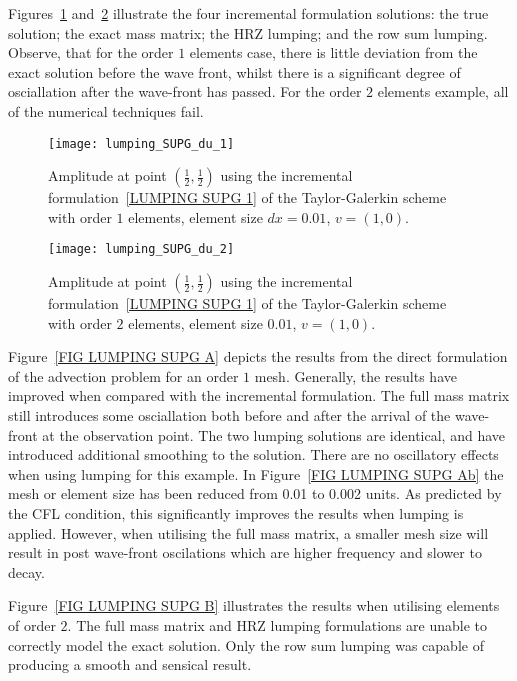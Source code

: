 Figures~\ref{FIG LUMPING SUPG INC A} and~\ref{FIG LUMPING SUPG INC B} illustrate
the four incremental formulation solutions: the true solution; the exact mass matrix;
the HRZ lumping; and the row sum lumping. Observe, that for the order $1$ elements
case, there is little deviation from the exact solution before the wave front,
whilst there is a significant degree of osciallation after the wave-front has 
passed. For the order $2$ elements example, all of the numerical techniques fail. 

\begin{figure}[ht]
\centerline{\texttt{[image: lumping\_SUPG\_du\_1]}}
\caption{Amplitude at point $(\frac{1}{2},\frac{1}{2})$ using the incremental formulation~\ref{LUMPING SUPG 1} of the 
Taylor-Galerkin scheme with order $1$ elements, element size $dx=0.01$, $v=(1,0)$.}
\label{FIG LUMPING SUPG INC A}
\end{figure}

\begin{figure}[ht]
\centerline{\texttt{[image: lumping\_SUPG\_du\_2]}}
\caption{Amplitude at point $(\frac{1}{2},\frac{1}{2})$ using the incremental formulation~\ref{LUMPING SUPG 1} of the 
Taylor-Galerkin scheme  with order $2$ elements, element size $0.01$, $v=(1,0)$.}
\label{FIG LUMPING SUPG INC B}
\end{figure}

Figure~\ref{FIG LUMPING SUPG A} depicts the results from the direct formulation
of the advection problem for an order $1$ mesh. Generally, the results have
improved when compared with the incremental formulation. The full mass matrix 
still introduces some osciallation both before and after the arrival of the 
wave-front at the observation point. The two lumping solutions are identical, and
have introduced additional smoothing to the solution. There are no oscillatory
effects when using lumping for this example. In Figure~\ref{FIG LUMPING SUPG Ab}
the mesh or element size has been reduced from 0.01 to 0.002 units. As predicted
by the CFL condition, this significantly improves the results when lumping is 
applied. However, when utilising the full mass matrix, a smaller mesh size will 
result in post wave-front oscilations which are higher frequency and slower to 
decay.

Figure~\ref{FIG LUMPING SUPG B} illustrates the results when utilising elements 
of order $2$. The full mass matrix and HRZ lumping formulations are unable to 
correctly model the exact solution. Only the row sum lumping was capable of 
producing a smooth and sensical result. 

